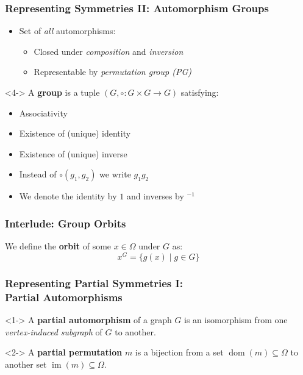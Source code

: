 \documentclass{beamer}
\begin{document}
\begin{frame}
  \frametitle{Representing Symmetries II: Automorphism Groups}

  \begin{itemize}
    \item Set of \textit{all} automorphisms:
      \begin{itemize}
        \item<2-> Closed under \textit{composition} and \textit{inversion}
        \item<3-> Representable by \textit{permutation group (PG)}
      \end{itemize}
  \end{itemize}

  \begin{definition}<4->
    A \textbf{group} is a tuple $(G, \circ: G \times G \rightarrow G)$
    satisfying:
    \begin{itemize}
      \item Associativity
      \item Existence of (unique) identity
      \item Existence of (unique) inverse
    \end{itemize}
  \end{definition}

  \begin{itemize}
    \setlength\itemsep{.25cm}

    \item<5-> Instead of $\circ(g_1, g_2)$ we write $g_1 g_2$
    \item<6-> We denote the identity by $1$ and inverses by $^{-1}$
  \end{itemize}
\end{frame}

\begin{frame}
  \frametitle{Interlude: Group Orbits}

  \begin{definition}
    We define the \textbf{orbit} of some $x \in \Omega$ under $G$ as:
    \begin{equation*}
      x^G = \{g(x) \mid g \in G\}
    \end{equation*}
  \end{definition}
\end{frame}

\begin{frame}
  \frametitle{Representing Partial Symmetries I:\\Partial Automorphisms}

  \begin{definition}<1->
    A \textbf{partial automorphism} of a graph $G$ is an isomorphism from one
    \textit{vertex-induced subgraph} of $G$ to another.
  \end{definition}

  \begin{definition}<2->
    A \textbf{partial permutation} $m$ is a bijection from a set
    $\operatorname{dom}(m) \subseteq \Omega$ to another set $\operatorname{im}(m)
    \subseteq \Omega$.
  \end{definition}
\end{frame}
\end{document}

